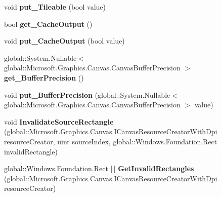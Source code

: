 \begin{DoxyCompactItemize}
void {\bfseries put\+\_\+\+Tileable} (bool value)
\item 
\mbox{\label{class_microsoft_1_1_graphics_1_1_canvas_1_1_effects_1_1_turbulence_effect_a2c596cbdbfb7b80b475624a4c9dce0e8}} 
bool {\bfseries get\+\_\+\+Cache\+Output} ()
\item 
\mbox{\label{class_microsoft_1_1_graphics_1_1_canvas_1_1_effects_1_1_turbulence_effect_a32c398e77df6916280569b73de4cbf02}} 
void {\bfseries put\+\_\+\+Cache\+Output} (bool value)
\item 
\mbox{\label{class_microsoft_1_1_graphics_1_1_canvas_1_1_effects_1_1_turbulence_effect_aa0fb0f26319e287cf2cc4971185f1c90}} 
global\+::\+System.\+Nullable$<$ global\+::\+Microsoft.\+Graphics.\+Canvas.\+Canvas\+Buffer\+Precision $>$ {\bfseries get\+\_\+\+Buffer\+Precision} ()
\item 
\mbox{\label{class_microsoft_1_1_graphics_1_1_canvas_1_1_effects_1_1_turbulence_effect_af5cfe0ab61f3b28ea69b35d8c65fb075}} 
void {\bfseries put\+\_\+\+Buffer\+Precision} (global\+::\+System.\+Nullable$<$ global\+::\+Microsoft.\+Graphics.\+Canvas.\+Canvas\+Buffer\+Precision $>$ value)
\item 
\mbox{\label{class_microsoft_1_1_graphics_1_1_canvas_1_1_effects_1_1_turbulence_effect_a8277a61a5c0e9ccf5bf06b2952d9ad6c}} 
void {\bfseries Invalidate\+Source\+Rectangle} (global\+::\+Microsoft.\+Graphics.\+Canvas.\+I\+Canvas\+Resource\+Creator\+With\+Dpi resource\+Creator, uint source\+Index, global\+::\+Windows.\+Foundation.\+Rect invalid\+Rectangle)
\item 
\mbox{\label{class_microsoft_1_1_graphics_1_1_canvas_1_1_effects_1_1_turbulence_effect_a45a2b70d1f2b56fc298b6088e92aaeff}} 
global\+::\+Windows.\+Foundation.\+Rect \mbox{[}$\,$\mbox{]} {\bfseries Get\+Invalid\+Rectangles} (global\+::\+Microsoft.\+Graphics.\+Canvas.\+I\+Canvas\+Resource\+Creator\+With\+Dpi resource\+Creator)

\end{DoxyCompactItemize}
